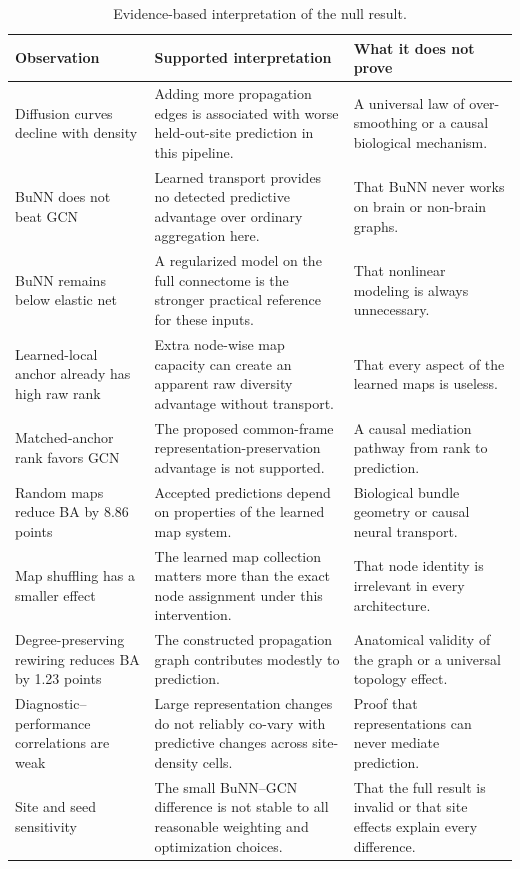 \documentclass[11pt,a4paper]{article}
\begin{document}
\begin{table}[htbp]
\centering
\caption{Evidence-based interpretation of the null result.}
\label{tab:explanation}
\small
\begin{tabularx}{\textwidth}{@{}p{3.1cm}Y Y@{}}
\toprule
\textbf{Observation} & \textbf{Supported interpretation} & \textbf{What it does not prove} \\
\midrule
Diffusion curves decline with density & Adding more propagation edges is associated with worse held-out-site prediction in this pipeline. & A universal law of over-smoothing or a causal biological mechanism. \\
BuNN does not beat GCN & Learned transport provides no detected predictive advantage over ordinary aggregation here. & That BuNN never works on brain or non-brain graphs. \\
BuNN remains below elastic net & A regularized model on the full connectome is the stronger practical reference for these inputs. & That nonlinear modeling is always unnecessary. \\
Learned-local anchor already has high raw rank & Extra node-wise map capacity can create an apparent raw diversity advantage without transport. & That every aspect of the learned maps is useless. \\
Matched-anchor rank favors GCN & The proposed common-frame representation-preservation advantage is not supported. & A causal mediation pathway from rank to prediction. \\
Random maps reduce BA by 8.86 points & Accepted predictions depend on properties of the learned map system. & Biological bundle geometry or causal neural transport. \\
Map shuffling has a smaller effect & The learned map collection matters more than the exact node assignment under this intervention. & That node identity is irrelevant in every architecture. \\
Degree-preserving rewiring reduces BA by 1.23 points & The constructed propagation graph contributes modestly to prediction. & Anatomical validity of the graph or a universal topology effect. \\
Diagnostic--performance correlations are weak & Large representation changes do not reliably co-vary with predictive changes across site-density cells. & Proof that representations can never mediate prediction. \\
Site and seed sensitivity & The small BuNN--GCN difference is not stable to all reasonable weighting and optimization choices. & That the full result is invalid or that site effects explain every difference. \\
\bottomrule
\end{tabularx}
\end{table}
\end{document}
